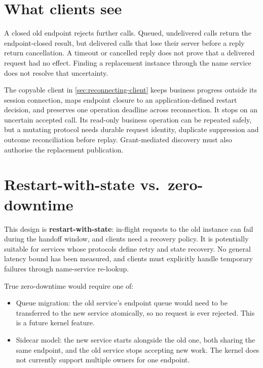 \section{What clients see}

A closed old endpoint rejects further calls. Queued, undelivered calls return
the endpoint-closed result, but delivered calls that lose their server before a
reply return cancellation. A timeout or cancelled reply does not prove that a
delivered request had no effect. Finding a replacement instance through the name
service does not resolve that uncertainty.

The copyable client in \autoref{sec:reconnecting-client} keeps business progress
outside its session connection, maps endpoint closure to an application-defined
restart decision, and preserves one operation deadline across reconnection.
It stops on an uncertain accepted call. Its read-only business operation can be
repeated safely, but a mutating protocol needs durable request identity, duplicate
suppression and outcome reconciliation before replay. Grant-mediated discovery
must also authorise the replacement publication.

\section{Restart-with-state vs.\ zero-downtime}

This design is \textbf{restart-with-state}: in-flight requests to the old
instance can fail during the handoff window, and clients need a recovery policy. It is
potentially suitable for services whose protocols define retry and state
recovery. No general latency bound has been measured, and clients must
explicitly handle temporary failures through name-service re-lookup.

True zero-downtime would require one of:

\begin{itemize}
    \item Queue migration: the old service's endpoint queue would
        need to be transferred to the new service atomically, so no request
        is ever rejected. This is a future kernel feature.
    \item Sidecar model: the new service starts alongside the old
        one, both sharing the same endpoint, and the old service stops
        accepting new work. The kernel does not currently support multiple
        owners for one endpoint.
\end{itemize}

